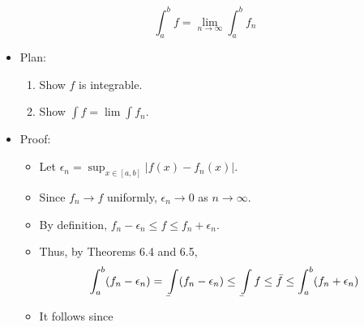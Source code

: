 \documentclass[../notes.tex]{subfiles}
\begin{document}
\begin{itemize}
\begin{equation*}
        \int_a^bf = \lim_{n\to\infty}\int_a^bf_n
    \end{equation*}
    \begin{itemize}
        \item Plan:
        \begin{enumerate}
            \item Show $f$ is integrable.
            \item Show $\int f=\lim\int f_n$.
        \end{enumerate}
        \item Proof:
        \begin{itemize}
            \item Let $\epsilon_n=\sup_{x\in[a,b]}|f(x)-f_n(x)|$.
            \item Since $f_n\to f$ uniformly, $\epsilon_n\to 0$ as $n\to\infty$.
            \item By definition, $f_n-\epsilon_n\leq f\leq f_n+\epsilon_n$.
            \item Thus, by Theorems 6.4 and 6.5,
            \begin{equation*}
                \int_a^b(f_n-\epsilon_n) = \underaccent{\bar}{\int}(f_n-\epsilon_n)
                \leq \underaccent{\bar}{\int}f
                \leq \bar{f}
                \leq \int_a^b(f_n+\epsilon_n)
            \end{equation*}
            \item It follows since

\end{itemize}
\end{itemize}
\end{itemize}
\end{document}

